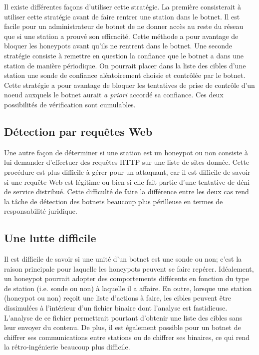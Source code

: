 Il existe différentes façons d'utiliser cette stratégie.  La première
consisterait à utiliser cette stratégie avant de faire rentrer une station dans
le botnet.  Il est facile pour un administrateur de botnet de ne donner accès
au reste du réseau que si une station a prouvé son efficacité. Cette méthode a
pour avantage de bloquer les honeypots avant qu'ils ne rentrent dans le botnet.
Une seconde stratégie consiste à remettre en question la confiance que le
botnet a dans une station de manière périodique. On pourrait placer dans la
liste des cibles d'une station une sonde de confiance aléatoirement choisie et
contrôlée par le botnet. Cette stratégie a pour avantage de bloquer les
tentatives de prise de contrôle d'un noeud auxquels le botnet aurait \textit{a
priori} accordé sa confiance.  Ces deux possibilités de vérification sont
cumulables.

\subsection{Détection par requêtes Web}

Une autre façon de déterminer si une station est un honeypot ou non consiste à
lui demander d'effectuer des requêtes HTTP sur une liste de sites donnée. Cette
procédure est plus difficile à gérer pour un attaquant, car il est difficile de
savoir si une requête Web est légitime ou bien si elle fait partie d'une
tentative de déni de service distribué. Cette difficulté de faire la différence
entre les deux cas rend la tâche de détection des botnets beaucoup plus
périlleuse en termes de responsabilité juridique.


\subsection{Une lutte difficile}

Il est difficile de savoir si une unité d'un botnet est une sonde ou non; c'est
la raison principale pour laquelle les honeypots peuvent se faire repérer.
Idéalement, un honeypot pourrait adopter des comportements différents en
fonction du type de station (i.e. sonde ou non) à laquelle il a affaire. En
outre, lorsque une station (honeypot ou non) reçoit une liste d'actions à faire,
les cibles peuvent être dissimulées à l'intérieur d'un fichier binaire dont
l'analyse est fastidieuse. L'analyse de ce fichier permettrait pourtant
d'obtenir une liste des cibles sans leur envoyer du contenu. De plus, il est
également possible pour un botnet de chiffrer ses communications entre stations
ou de chiffrer ses binaires, ce qui rend la rétro-ingénierie beaucoup plus
difficile.

